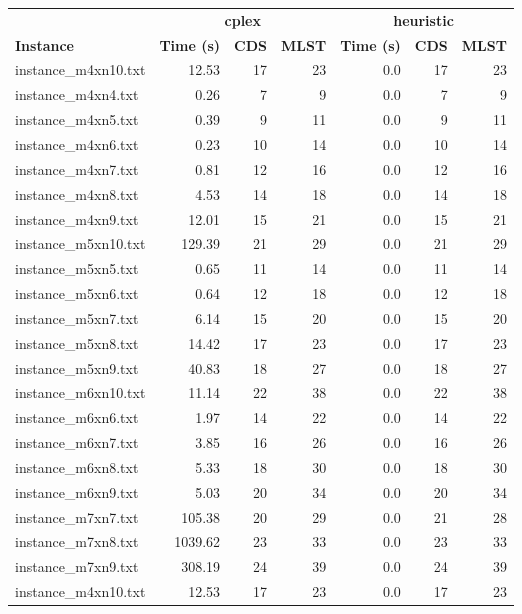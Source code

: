 \documentclass{article}
\begin{document}
\begin{center}
\renewcommand{\arraystretch}{1.4}
 \begin{tabular}{lrrrrrr}
	\hline
 & \multicolumn{3}{c}{\textbf{cplex}} & \multicolumn{3}{c}{\textbf{heuristic}}\\
\textbf{Instance}  & \textbf{Time (s)} & \textbf{CDS} & \textbf{MLST}   & \textbf{Time (s)} & \textbf{CDS} & \textbf{MLST}  \\\hline

instance\_m4xn10.txt & 12.53 & 17 & 23
 & 0.0 & 17 & 23
\\
instance\_m4xn4.txt & 0.26 & 7 & 9
 & 0.0 & 7 & 9
\\
instance\_m4xn5.txt & 0.39 & 9 & 11
 & 0.0 & 9 & 11
\\
instance\_m4xn6.txt & 0.23 & 10 & 14
 & 0.0 & 10 & 14
\\
instance\_m4xn7.txt & 0.81 & 12 & 16
 & 0.0 & 12 & 16
\\
instance\_m4xn8.txt & 4.53 & 14 & 18
 & 0.0 & 14 & 18
\\
instance\_m4xn9.txt & 12.01 & 15 & 21
 & 0.0 & 15 & 21
\\
instance\_m5xn10.txt & 129.39 & 21 & 29
 & 0.0 & 21 & 29
\\
instance\_m5xn5.txt & 0.65 & 11 & 14
 & 0.0 & 11 & 14
\\
instance\_m5xn6.txt & 0.64 & 12 & 18
 & 0.0 & 12 & 18
\\
instance\_m5xn7.txt & 6.14 & 15 & 20
 & 0.0 & 15 & 20
\\
instance\_m5xn8.txt & 14.42 & 17 & 23
 & 0.0 & 17 & 23
\\
instance\_m5xn9.txt & 40.83 & 18 & 27
 & 0.0 & 18 & 27
\\
instance\_m6xn10.txt & 11.14 & 22 & 38
 & 0.0 & 22 & 38
\\
instance\_m6xn6.txt & 1.97 & 14 & 22
 & 0.0 & 14 & 22
\\
instance\_m6xn7.txt & 3.85 & 16 & 26
 & 0.0 & 16 & 26
\\
instance\_m6xn8.txt & 5.33 & 18 & 30
 & 0.0 & 18 & 30
\\
instance\_m6xn9.txt & 5.03 & 20 & 34
 & 0.0 & 20 & 34
\\
instance\_m7xn7.txt & 105.38 & 20 & 29
 & 0.0 & 21 & 28
\\
instance\_m7xn8.txt & 1039.62 & 23 & 33
 & 0.0 & 23 & 33
\\
instance\_m7xn9.txt & 308.19 & 24 & 39
 & 0.0 & 24 & 39
\\
instance\_m4xn10.txt & 12.53 & 17 & 23
 & 0.0 & 17 & 23

\end{tabular}
\end{center}
\end{document}
